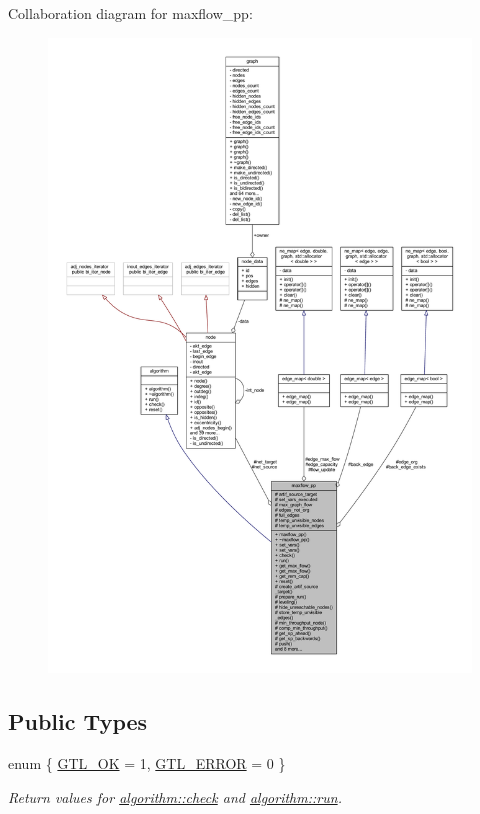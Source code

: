 Collaboration diagram for maxflow\+\_\+pp\+:\nopagebreak
\begin{figure}[H]
\begin{center}
\leavevmode
\includegraphics[width=350pt]{classmaxflow__pp__coll__graph}
\end{center}
\end{figure}
\subsection*{Public Types}
\begin{DoxyCompactItemize}
\item 
enum \{ \mbox{\hyperlink{classalgorithm_af1a0078e153aa99c24f9bdf0d97f6710a5114c20e4a96a76b5de9f28bf15e282b}{G\+T\+L\+\_\+\+OK}} = 1, 
\mbox{\hyperlink{classalgorithm_af1a0078e153aa99c24f9bdf0d97f6710a6fcf574690bbd6cf710837a169510dd7}{G\+T\+L\+\_\+\+E\+R\+R\+OR}} = 0
 \}
\begin{DoxyCompactList}\small\item\em Return values for \mbox{\hyperlink{classalgorithm_a76361fb03ad1cf643affc51821e43bed}{algorithm\+::check}} and \mbox{\hyperlink{classalgorithm_a734b189509a8d6b56b65f8ff772d43ca}{algorithm\+::run}}. \end{DoxyCompactList}\end{DoxyCompactItemize}
